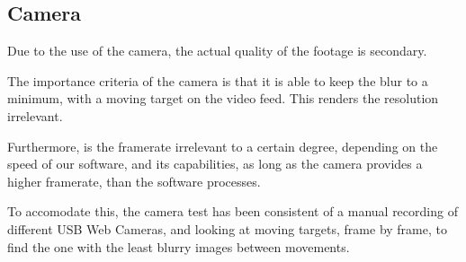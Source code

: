 \subsection*{Camera}
Due to the use of the camera, the actual quality of the footage is secondary.

The importance criteria of the camera is that it is able to keep the blur to a minimum, with a moving target on the video feed.
This renders the resolution irrelevant.

Furthermore, is the framerate irrelevant to a certain degree, depending on the speed of our software, and its capabilities, as long as the camera provides a higher framerate, than the software processes.

To accomodate this, the camera test has been consistent of a manual recording of different USB Web Cameras, and looking at moving targets, frame by frame, to find the one with the least blurry images between movements.
